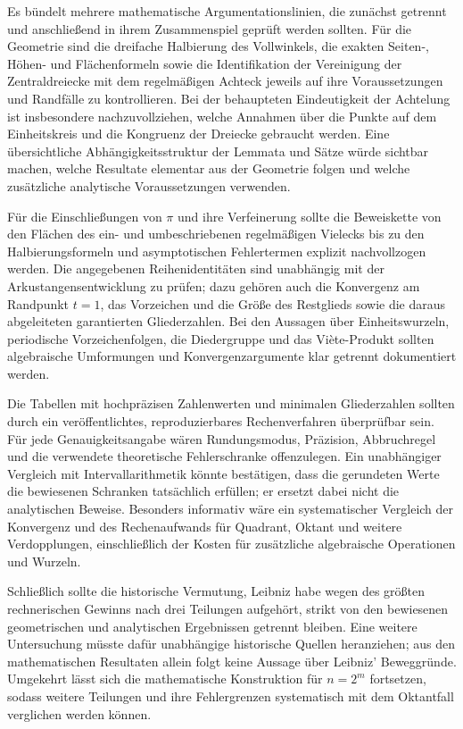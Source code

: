 \documentclass[a4paper,12pt,twoside]{report}
\theoremstyle{definition}
\begin{document}
Es bündelt mehrere mathematische Argumentationslinien, die zunächst getrennt und anschließend in ihrem Zusammenspiel geprüft werden sollten. Für die Geometrie sind die dreifache Halbierung des Vollwinkels, die exakten Seiten-, Höhen- und Flächenformeln sowie die Identifikation der Vereinigung der Zentraldreiecke mit dem regelmäßigen Achteck jeweils auf ihre Voraussetzungen und Randfälle zu kontrollieren. Bei der behaupteten Eindeutigkeit der Achtelung ist insbesondere nachzuvollziehen, welche Annahmen über die Punkte auf dem Einheitskreis und die Kongruenz der Dreiecke gebraucht werden. Eine übersichtliche Abhängigkeitsstruktur der Lemmata und Sätze würde sichtbar machen, welche Resultate elementar aus der Geometrie folgen und welche zusätzliche analytische Voraussetzungen verwenden.

Für die Einschließungen von $\pi$ und ihre Verfeinerung sollte die Beweiskette von den Flächen des ein- und umbeschriebenen regelmäßigen Vielecks bis zu den Halbierungsformeln und asymptotischen Fehlertermen explizit nachvollzogen werden. Die angegebenen Reihenidentitäten sind unabhängig mit der Arkustangensentwicklung zu prüfen; dazu gehören auch die Konvergenz am Randpunkt $t=1$, das Vorzeichen und die Größe des Restglieds sowie die daraus abgeleiteten garantierten Gliederzahlen. Bei den Aussagen über Einheitswurzeln, periodische Vorzeichenfolgen, die Diedergruppe und das Viète-Produkt sollten algebraische Umformungen und Konvergenzargumente klar getrennt dokumentiert werden.

Die Tabellen mit hochpräzisen Zahlenwerten und minimalen Gliederzahlen sollten durch ein veröffentlichtes, reproduzierbares Rechenverfahren überprüfbar sein. Für jede Genauigkeitsangabe wären Rundungsmodus, Präzision, Abbruchregel und die verwendete theoretische Fehlerschranke offenzulegen. Ein unabhängiger Vergleich mit Intervallarithmetik könnte bestätigen, dass die gerundeten Werte die bewiesenen Schranken tatsächlich erfüllen; er ersetzt dabei nicht die analytischen Beweise. Besonders informativ wäre ein systematischer Vergleich der Konvergenz und des Rechenaufwands für Quadrant, Oktant und weitere Verdopplungen, einschließlich der Kosten für zusätzliche algebraische Operationen und Wurzeln.

Schließlich sollte die historische Vermutung, Leibniz habe wegen des größten rechnerischen Gewinns nach drei Teilungen aufgehört, strikt von den bewiesenen geometrischen und analytischen Ergebnissen getrennt bleiben. Eine weitere Untersuchung müsste dafür unabhängige historische Quellen heranziehen; aus den mathematischen Resultaten allein folgt keine Aussage über Leibniz' Beweggründe. Umgekehrt lässt sich die mathematische Konstruktion für $n=2^m$ fortsetzen, sodass weitere Teilungen und ihre Fehlergrenzen systematisch mit dem Oktantfall verglichen werden können.
\end{document}
